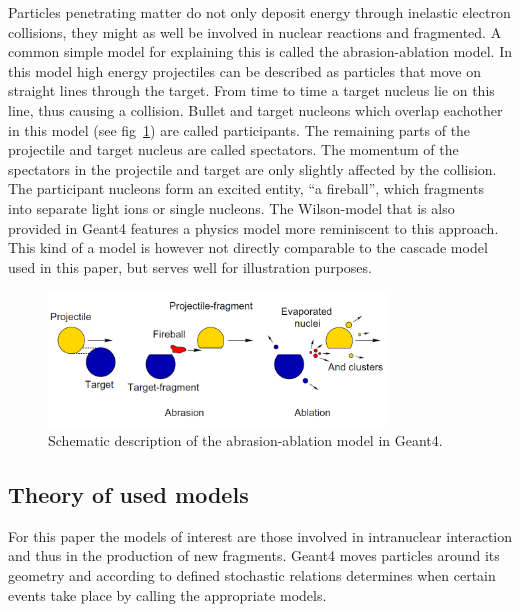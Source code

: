 Particles penetrating matter do not only deposit energy through inelastic electron collisions, they might as well be involved in nuclear reactions and fragmented. A common simple model for explaining this is called the abrasion-ablation model. In this model high energy projectiles can be described as particles that move on straight lines through the
target. From time to time a target nucleus lie on this line, thus causing a collision. Bullet
and target nucleons which overlap eachother in this model (see fig~\ref{fig:ablationabration}) are called participants. The remaining parts of the projectile and target nucleus are called spectators. The momentum of the spectators in the projectile and target are only slightly affected by the collision. The participant nucleons form an excited entity, ``a fireball'', which fragments into separate light ions or single nucleons.
The Wilson-model\cite[Chapter 27]{physicsManual} that is also provided in Geant4 features a physics model more reminiscent to this approach. This kind of a model is however not directly comparable to the cascade model used in this paper, but serves well for illustration purposes.
\begin{figure}[h]
\begin{center}
\includegraphics[width=0.8\textwidth]{images/ablationabration.png}  
\caption{Schematic description of the abrasion-ablation model in Geant4.~\cite[Chapter 27]{physicsManual}}
 \label{fig:ablationabration}
 \end{center}
 \end{figure}



\subsection{Theory of used models} %

For this paper the models of interest are those involved in intranuclear interaction and thus in the production of new fragments. Geant4 moves particles around its geometry and according to defined stochastic relations determines when certain events take place by calling the appropriate models.

